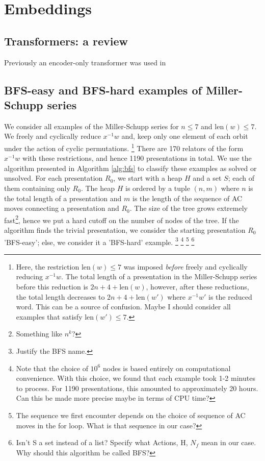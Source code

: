 
\section{Embeddings}

\subsection{Transformers: a review}

Previously an encoder-only transformer was used in

\subsection{BFS-easy and BFS-hard examples of Miller-Schupp series}

We consider all examples of the Miller-Schupp series for $n \leq 7$ and $\text{len}(w) \leq 7$.
We freely and cyclically reduce $x^{-1}w$ and, keep only one element of each orbit under the action of cyclic permutations.
\footnote{Here, the restriction len$(w) \leq 7$ was imposed \textit{before} freely and cyclically reducing $x^{-1}w$.
The total length of a presentation in the Miller-Schupp series before this reduction is $2n+4+\text{len}(w)$, however, after these reductions, the total length decreases to $2n+4+\text{len}(w')$ where $x^{-1}w'$ is the reduced word.
This can be a source of confusion.
Maybe I should consider all examples that satisfy $\text{len}(w') \leq 7$.}
There are 170 relators of the form $x^{-1}w$ with these restrictions, and hence 1190 presentations in total.
We use the algorithm presented in Algorithm \autoref{alg:bfs} to classify these examples as solved or unsolved.
For each presentation $R_0$, we start with a heap $H$ and a set $S$; each of them containing only $R_0$.
The heap $H$ is ordered by a tuple $(n, m)$ where $n$ is the total length of a presentation and $m$ is the length of the sequence of AC moves connecting a presentation and $R_0$.
The size of the tree grows extremely fast\footnote{Something like $n^k$?}, hence we put a hard cutoff on the number of nodes of the tree.
If the algorithm finds the trivial presentation, we consider the starting presentation $R_0$ 'BFS-easy'; else, we consider it a 'BFS-hard' example.
\footnote{Justify the BFS name.}
\footnote{Note that the choice of $10^6$ nodes is based entirely on computational convenience.
With this choice, we found that each example took 1-2 minutes to process.
For 1190 presentations, this amounted to approximately 20 hours.
Can this be made more precise maybe in terms of CPU time?}
\footnote{The sequence we first encounter depends on the choice of sequence of AC moves in the for loop.
What is that sequence in our case?}
\footnote{Isn't S a set instead of a list? Specify what Actions, H, $N_f$ mean in our case.
Why should this algorithm be called BFS?}

